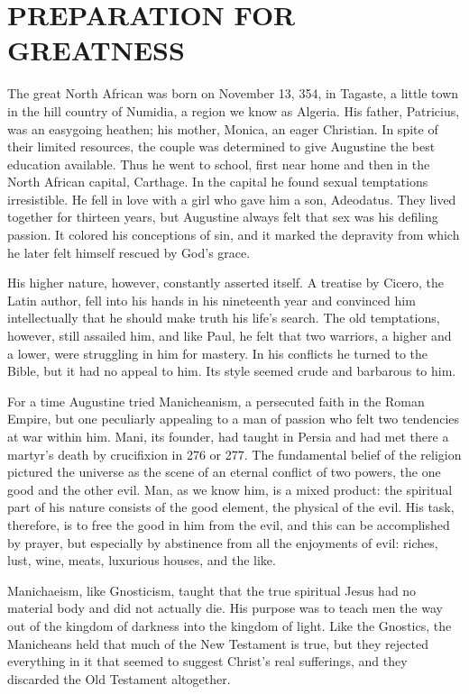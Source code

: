 \section{PREPARATION FOR GREATNESS}

The great North African was born on November 13, 354, in Tagaste, a little town in the hill country
of Numidia, a region we know as Algeria. His father, Patricius, was an easygoing heathen; his
mother, Monica, an eager Christian. In spite of their limited resources, the couple was determined
to give Augustine the best education available. Thus he went to school, first near home and then in
the North African capital, Carthage. In the capital he found sexual temptations irresistible. He
fell in love with a girl who gave him a son, Adeodatus. They lived together for thirteen years, but
Augustine always felt that sex was his defiling passion. It colored his conceptions of sin, and it
marked the depravity from which he later felt himself rescued by God’s grace.

His higher nature, however, constantly asserted itself. A treatise by Cicero, the Latin author, fell
into his hands in his nineteenth year and convinced him intellectually that he should make truth his
life’s search. The old temptations, however, still assailed him, and like Paul, he felt that two
warriors, a higher and a lower, were struggling in him for mastery. In his conflicts he turned to
the Bible, but it had no appeal to him. Its style seemed crude and barbarous to him.

For a time Augustine tried Manicheanism, a persecuted faith in the Roman Empire, but one peculiarly
appealing to a man of passion who felt two tendencies at war within him. Mani, its founder, had
taught in Persia and had met there a martyr’s death by crucifixion in 276 or 277. The fundamental
belief of the religion pictured the universe as the scene of an eternal conflict of two powers, the
one good and the other evil. Man, as we know him, is a mixed product: the spiritual part of his
nature consists of the good element, the physical of the evil. His task, therefore, is to free the
good in him from the evil, and this can be accomplished by prayer, but especially by abstinence from
all the enjoyments of evil: riches, lust, wine, meats, luxurious houses, and the like.

Manichaeism, like Gnosticism, taught that the true spiritual Jesus had no material body and did not
actually die. His purpose was to teach men the way out of the kingdom of darkness into the kingdom
of light. Like the Gnostics, the Manicheans held that much of the New Testament is true, but they
rejected everything in it that seemed to suggest Christ’s real sufferings, and they discarded the
Old Testament altogether.

